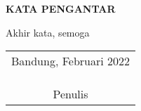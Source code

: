 \begin{center}
  \Large\textbf{KATA PENGANTAR}
\end{center}
\vspace{2ex}



Akhir kata, semoga \lipsum[4][1-8]

\begin{flushright}
  \begin{tabular}[b]{c}
    Bandung, Februari 2022
    \\
    \\
    \\
    \\
    Penulis
  \end{tabular}
\end{flushright}

